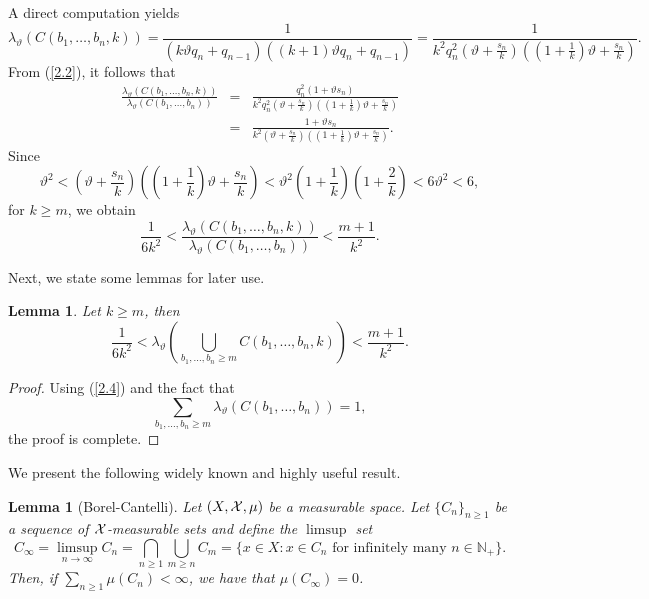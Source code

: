 \documentclass[final,1p,times]{elsarticle}
\newtheorem{lemma}[theorem]{Lemma}
\numberwithin{equation}{section}
\begin{document}
A direct computation yields  
%
\begin{equation*}
\lambda_{\vartheta}\left(C\left(b_1, \ldots, b_n, k\right)\right) = \frac{1}{(k\vartheta q_n + q_{n-1})((k+1)\vartheta q_n + q_{n-1})} =  \frac{1}{k^2q^2_n\left(\vartheta + \frac{s_n}{k}\right)\left( \left( 1+\frac{1}{k} \right) \vartheta +\frac{s_n}{k} \right) }. 
\end{equation*}
%
From (\ref{2.2}), it follows that  
\begin{eqnarray*}
\frac{\lambda_{\vartheta}\left(C\left(b_1, \ldots, b_n, k\right)\right)}{\lambda_{\vartheta}\left(C\left(b_1, \ldots, b_n\right)\right)} 
&=& 
\frac{q^2_n(1+\vartheta s_n)}{k^2q^2_n\left(\vartheta + \frac{s_n}{k}\right)\left( \left( 1+\frac{1}{k} \right) \vartheta +\frac{s_n}{k} \right)} \\
&=& \frac{1+\vartheta s_n}{k^2 \left(\vartheta + \frac{s_n}{k}\right)\left( \left( 1+\frac{1}{k} \right) \vartheta +\frac{s_n}{k} \right)}. 
\end{eqnarray*}
%
Since  
\[
\vartheta^2 < \left(\vartheta + \frac{s_n}{k}\right)\left( \left( 1+\frac{1}{k} \right) \vartheta +\frac{s_n}{k} \right) 
< \vartheta^2 \left( 1+\frac{1}{k} \right) \left( 1+\frac{2}{k} \right) < 6 \vartheta^2 < 6,  
\]
for $k \geq m$, we obtain  
\begin{equation}
\frac{1}{6k^2} < \frac{\lambda_{\vartheta}\left(C\left(b_1, \ldots, b_n, k\right)\right)}{\lambda_{\vartheta}\left(C\left(b_1, \ldots, b_n\right)\right)} < \frac{m+1}{k^2}.  \label{2.4}
\end{equation}
%

Next, we state some lemmas for later use.
\begin{lemma} \label{lema2.1}
Let $k \geq m$, then 
\[
\frac{1}{6k^2} < \lambda_{\vartheta}\left( \bigcup_{b_1,\ldots,b_n \geq m} C\left(b_1, \ldots, b_n, k\right)\right) < \frac{m+1}{k^2}. 
\]
\end{lemma}
\begin{proof}
Using (\ref{2.4}) and the fact that  
\[
\sum_{b_1,\ldots,b_n \geq m} \lambda_{\vartheta}\left( C\left(b_1, \ldots, b_n \right)\right) = 1,
\]  
the proof is complete.
\end{proof}

We present the following widely known and highly useful result.
%
\begin{lemma}[Borel-Cantelli] \label{lema2.2}
Let $(X,{\cal X}, \mu)$ be a measurable space. Let $\{C_n\}_{n\geq 1}$ be a sequence of ${\cal X}$-measurable sets and define the $\limsup$ set
\[
C_{\infty} = \limsup_{n \to \infty} C_n = \bigcap_{n\geq 1} \bigcup_{m\geq n} C_m = \{x \in X: x \in C_n \mbox{ for infinitely many } n \in \mathbb{N}_+ \}. 
\]
Then, if $\displaystyle \sum_{n \geq 1} \mu(C_n) < \infty$, we have that $\mu(C_{\infty})=0$. 
\end{lemma}
\end{document}
